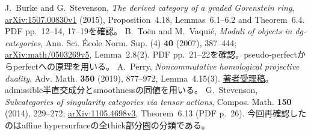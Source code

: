 J.~Burke and G.~Stevenson, \emph{The derived category of a graded Gorenstein ring},
\href{https://arxiv.org/abs/1507.00830}{arXiv:1507.00830v1} (2015),
Proposition~4.18, Lemmas~6.1--6.2 and Theorem~6.4.
PDF pp.~12--14, 17--19を確認。
B.~To\"en and M.~Vaqui\'e, \emph{Moduli of objects in dg-categories},
Ann. Sci. \'Ecole Norm. Sup. (4) \textbf{40} (2007), 387--444;
\href{https://arxiv.org/abs/math/0503269}{arXiv:math/0503269v5}, Lemma~2.8(2).
PDF pp.~21--22を確認。pseudo-perfectからperfectへの原理を用いる。
A.~Perry, \emph{Noncommutative homological projective duality},
Adv. Math. \textbf{350} (2019), 877--972, Lemma~4.15(3).
\href{https://www.sciencedirect.com/science/article/am/pii/S000187081930221X}{著者受理稿}。
admissible半直交成分とsmoothnessの同値を用いる。
G.~Stevenson, \emph{Subcategories of singularity categories via tensor actions},
Compos. Math. \textbf{150} (2014), 229--272;
\href{https://arxiv.org/abs/1105.4698}{arXiv:1105.4698v3}, Theorem~6.13 (PDF p.~26).
今回再確認したのはaffine hypersurfaceの全thick部分圏の分類である。
